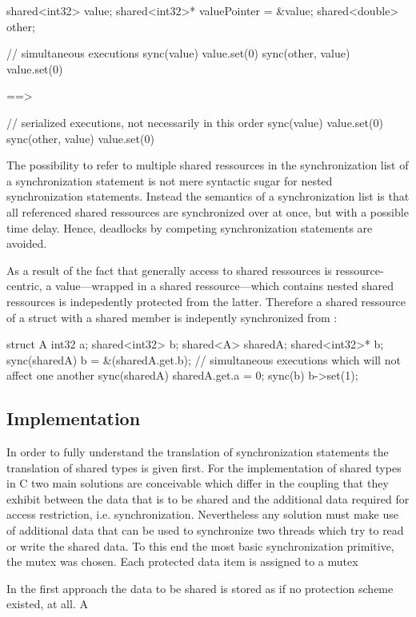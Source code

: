 \begin{ccode}
shared<int32> value;
shared<int32>* valuePointer = &value;
shared<double> other;

// simultaneous executions 
sync(value) { value.set(0) }        sync(other, value) { value.set(0) }
\end{ccode}
==>
\begin{ccode}
// serialized executions, not necessarily in this order
sync(value) { value.set(0) }
sync(other, value) { value.set(0) }
\end{ccode}

The possibility to refer to multiple shared ressources in the synchronization list of a synchronization statement is not mere syntactic sugar for nested synchronization statements. Instead the semantics of a synchronization list is that all referenced shared ressources are synchronized over at once, but with a possible time delay. Hence, deadlocks by competing synchronization statements are avoided.

As a result of the fact that generally access to shared ressources is ressource-centric, a value---wrapped in a shared ressource---which contains nested shared ressources is indepedently protected from the latter. Therefore a shared ressource of a struct with a shared member  is indepently synchronized from :

\begin{ccode}
struct A {
  int32 a;
  shared<int32> b; 
}
shared<A> sharedA;
shared<int32>* b;
sync(sharedA) { b = &(sharedA.get.b); }
// simultaneous executions which will not affect one another
sync(sharedA) { sharedA.get.a = 0; }   sync(b) { b->set(1); }
\end{ccode}


\subsection{Implementation}
In order to fully understand the translation of synchronization statements the translation of shared types is given first. For the implementation of shared types in C two main solutions are conceivable which differ in the coupling that they exhibit between the data that is to be shared and the additional data required for access restriction, i.e. synchronization. Nevertheless any solution must make use of additional data that can be used to synchronize two threads which try to read or write the shared data. To this end the most basic synchronization primitive, the mutex was chosen. Each protected data item is assigned to a mutex 

In the first approach the data to be shared is stored as if no protection scheme existed, at all. A